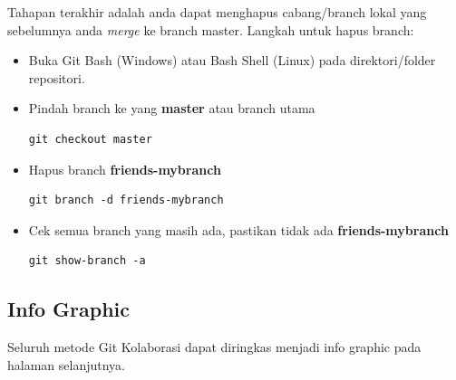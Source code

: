 \documentclass[12pt]{article}
\begin{document}
	Tahapan terakhir adalah anda dapat menghapus cabang/branch lokal yang sebelumnya anda \textit{merge} ke branch master.
	Langkah untuk hapus branch:
	
	\begin{itemize}
		\item Buka Git Bash (Windows) atau Bash Shell (Linux) pada direktori/folder repositori.
		
		\item Pindah branch ke yang \textbf{master} atau branch utama
		\begin{verbatim}
git checkout master
		\end{verbatim}
		
		\item Hapus branch \textbf{friends-mybranch}
		\begin{verbatim}
git branch -d friends-mybranch
		\end{verbatim}
		
		\item Cek semua branch yang masih ada, pastikan tidak ada \textbf{friends-mybranch}
		\begin{verbatim}
git show-branch -a
		\end{verbatim}
	\end{itemize}

	\subsection{Info Graphic}
	
	Seluruh metode Git Kolaborasi dapat diringkas menjadi info graphic pada halaman selanjutnya.

\newpage

	


%
%	
%	
%	
%	
%	

	
\end{document}
